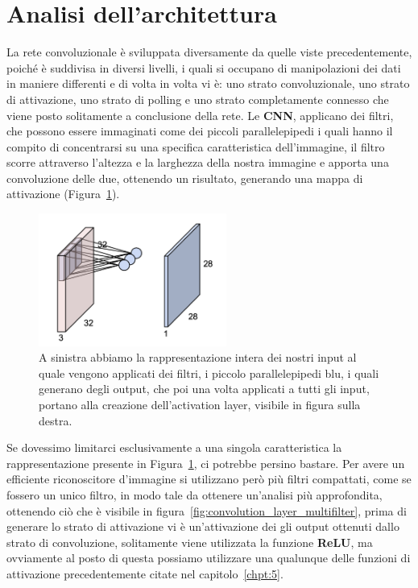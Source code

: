 \section{Analisi dell'architettura}
La rete convoluzionale è sviluppata diversamente da quelle viste precedentemente, poiché è suddivisa in diversi livelli, i quali si occupano di manipolazioni dei dati in maniere differenti e di volta in volta vi è: uno strato convoluzionale, uno strato di attivazione, uno strato di polling e uno strato completamente connesso che viene posto solitamente a conclusione della rete. Le \textbf{CNN}, applicano dei filtri, che possono essere immaginati come dei piccoli parallelepipedi i quali hanno il compito di concentrarsi su una specifica caratteristica dell'immagine, il filtro scorre attraverso l'altezza e la larghezza della nostra immagine e apporta una convoluzione delle due, ottenendo un risultato, generando una mappa di attivazione (Figura~\ref{fig:convolution_layer}).

\begin{figure}[htbp]
    \centering
    \includegraphics[width=0.55\textwidth]{figure/CNNConv.png}
    \caption{A sinistra abbiamo la rappresentazione intera dei nostri input al quale vengono applicati dei filtri, i piccolo parallelepipedi blu, i quali generano degli output, che poi una volta applicati a tutti gli input, portano alla creazione dell'activation layer, visibile in figura sulla destra.}
    \label{fig:convolution_layer}
\end{figure}

Se dovessimo limitarci esclusivamente a una singola caratteristica la rappresentazione presente in Figura~\ref{fig:convolution_layer}, ci potrebbe persino bastare. Per avere un efficiente riconoscitore d'immagine si utilizzano però più filtri compattati, come se fossero un unico filtro, in modo tale da ottenere un'analisi più approfondita, ottenendo ciò che è visibile in figura~\ref{fig:convolution_layer_multifilter}, prima di generare lo strato di attivazione vi è un'attivazione dei gli output ottenuti dallo strato di convoluzione, solitamente viene utilizzata la funzione \textbf{ReLU}, ma ovviamente al posto di questa possiamo utilizzare una qualunque delle funzioni di attivazione precedentemente citate nel capitolo~\ref{chpt:5}.


